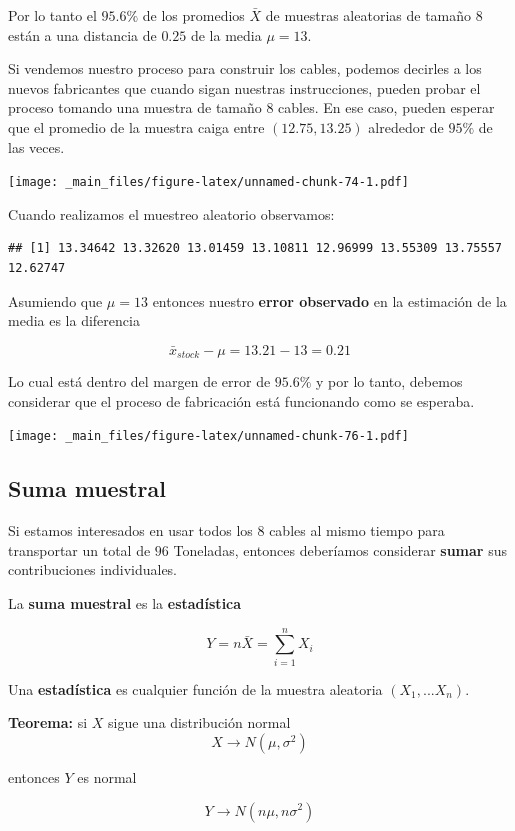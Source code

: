 \documentclass[
]{book}
\begin{document}
Por lo tanto el \(95.6\%\) de los promedios \(\bar{X}\) de muestras aleatorias de tamaño \(8\) están a una distancia de \(0.25\) de la media \(\mu=13\).

Si vendemos nuestro proceso para construir los cables, podemos decirles a los nuevos fabricantes que cuando sigan nuestras instrucciones, pueden probar el proceso tomando una muestra de tamaño \(8\) cables. En ese caso, pueden esperar que el promedio de la muestra caiga entre \((12.75, 13.25)\) alrededor de \(95\%\) de las veces.

\texttt{[image: \_main\_files/figure-latex/unnamed-chunk-74-1.pdf]}

Cuando realizamos el muestreo aleatorio observamos:

\begin{verbatim}
## [1] 13.34642 13.32620 13.01459 13.10811 12.96999 13.55309 13.75557 12.62747
\end{verbatim}

Asumiendo que \(\mu=13\) entonces nuestro \textbf{error observado} en la estimación de la media es la diferencia

\[\bar{x}_{stock}-\mu=13.21-13=0.21\]

Lo cual está dentro del margen de error de \(95.6\%\) y por lo tanto, debemos considerar que el proceso de fabricación está funcionando como se esperaba.

\texttt{[image: \_main\_files/figure-latex/unnamed-chunk-76-1.pdf]}

\hypertarget{suma-muestral}{%
\subsection{Suma muestral}\label{suma-muestral}}

Si estamos interesados en usar todos los \(8\) cables al mismo tiempo para transportar un total de \(96\) Toneladas, entonces deberíamos considerar \textbf{sumar} sus contribuciones individuales.

La \textbf{suma muestral} es la \textbf{estadística}

\[Y=n \bar{X}=\sum_{i=1}^n X_i\]

Una \textbf{estadística} es cualquier función de la muestra aleatoria \((X_1, ... X_n)\).

\textbf{Teorema:} si \(X\) sigue una distribución normal
\[X \rightarrow N(\mu, \sigma^2)\]

entonces \(Y\) es normal

\[Y \rightarrow N(n\mu, n\sigma^2)\]
\end{document}
